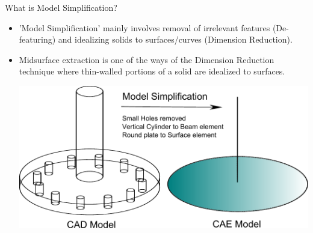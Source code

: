 \begin{frame}{What is Model Simplification?}
\begin{itemize}[noitemsep,label=\textbullet,topsep=2pt,parsep=2pt,partopsep=2pt]
\item 'Model Simplification' mainly involves removal of irrelevant features (De-featuring) and idealizing solids to surfaces/curves (Dimension Reduction).
\item Midsurface extraction is one of the ways of the Dimension Reduction technique where thin-walled portions of a solid are idealized to surfaces.

\vspace{.5cm}
\includegraphics[width=0.85\linewidth]{../Common/images/ModelSimplification.pdf}
\end{itemize}
\end{frame}


